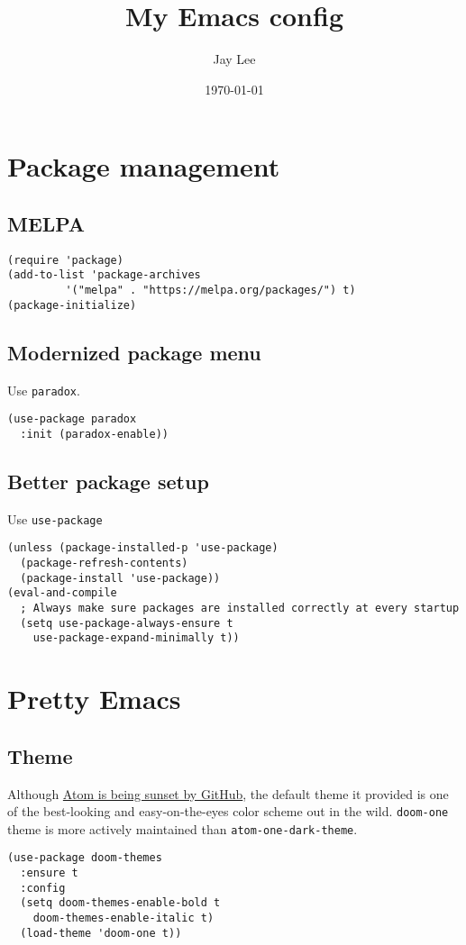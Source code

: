 \documentclass[11pt]{article}
\author{Jay Lee}
\date{\today}
\title{My Emacs config}
\begin{document}
\maketitle
\tableofcontents


\section{Package management}
\label{sec:orgb7a5715}
\subsection{MELPA}
\label{sec:org46dc425}
\begin{verbatim}
(require 'package)
(add-to-list 'package-archives
	     '("melpa" . "https://melpa.org/packages/") t)
(package-initialize)
\end{verbatim}

\subsection{Modernized package menu}
\label{sec:org9631a5c}
Use \texttt{paradox}.
\begin{verbatim}
(use-package paradox
  :init (paradox-enable))
\end{verbatim}

\subsection{Better package setup}
\label{sec:org3c78db8}
Use \texttt{use-package}
\begin{verbatim}
(unless (package-installed-p 'use-package)
  (package-refresh-contents)
  (package-install 'use-package))
(eval-and-compile
  ; Always make sure packages are installed correctly at every startup
  (setq use-package-always-ensure t
	use-package-expand-minimally t))
\end{verbatim}

\section{Pretty Emacs}
\label{sec:orga1cc6da}
\subsection{Theme}
\label{sec:orgadc645b}
Although \href{https://github.blog/2022-06-08-sunsetting-atom/}{Atom is being sunset by GitHub}, the default theme it provided is one of the best-looking and easy-on-the-eyes color scheme out in the wild.
\texttt{doom-one} theme is more actively maintained than \texttt{atom-one-dark-theme}.
\begin{verbatim}
(use-package doom-themes
  :ensure t
  :config
  (setq doom-themes-enable-bold t
	doom-themes-enable-italic t)
  (load-theme 'doom-one t))
\end{verbatim}
\end{document}
